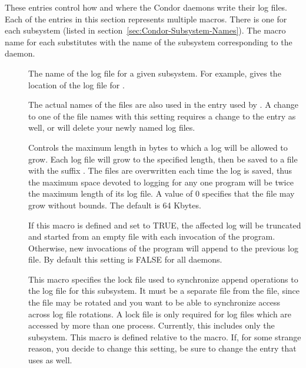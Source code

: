 These entries control how and where the Condor daemons write their log
files.  Each of the entries in this section represents multiple
macros. There is one for each subsystem (listed
in section~\ref{sec:Condor-Subsystem-Names}).
The macro name for each substitutes  with the name
of the subsystem corresponding to the daemon.
\begin{description}
 
\item[] \label{param:SubsysLog} The name of
  the log file for a given subsystem.  For example,
   gives the location of the log file for
  .

  The actual names of the files
  are also used in the  entry used by
  .  A change to one of the
  file names with this setting requires a change to the
   entry as well, or  will
  delete your newly named log files.

\item[] \label{param:MaxSubsysLog} Controls
  the maximum length in bytes to which a
  log will be allowed to grow.  Each log file will grow to the
  specified length, then be saved to a file with the suffix
  .  The 
  files are overwritten each time the log is saved, thus the maximum
  space devoted to logging for any one program will be twice the
  maximum length of its log file.  A value of 0 specifies that the
  file may grow without bounds.  The default is 64 Kbytes.

\item[]
  \label{param:TruncSubsysLogOnOpen}  If this macro is defined and set
  to TRUE, the affected log will be truncated and started from an
  empty file with each invocation of the program.  Otherwise, new
  invocations of the program will append to the previous log
  file.  By default this setting is FALSE for all daemons. 

\item[] \label{param:SubsysLock} This macro
  specifies the lock file used to synchronize append operations to the
  log file for this subsystem.  It must be a separate file from the
   file, since the  file may be
  rotated and you want to be able to synchronize access across log
  file rotations.  A lock file is only required for log files which
  are accessed by more than one process.  Currently, this includes
  only the  subsystem.  This macro is defined relative
  to the  macro.  If, for some strange
  reason, you decide to change this setting, be sure to change the
   entry that  uses as well.


\end{description}
